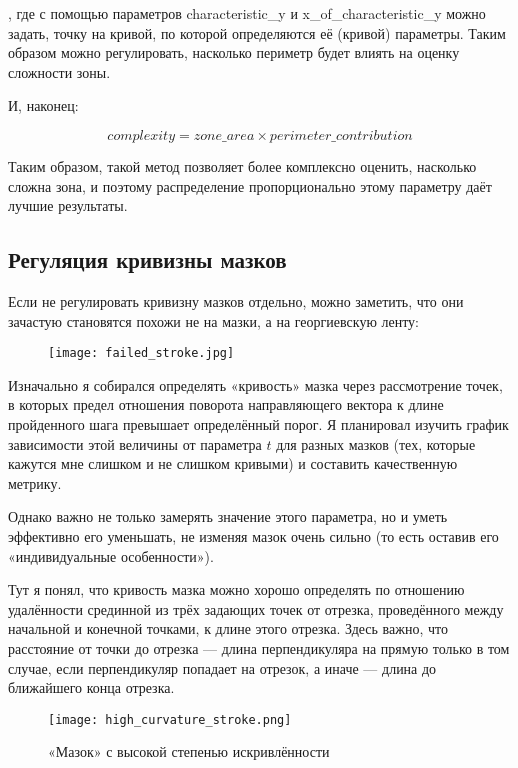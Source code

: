, где с помощью параметров characteristic\_y и x\_of\_characteristic\_y можно задать, точку на кривой,
по которой определяются её (кривой) параметры.
Таким образом можно регулировать, насколько периметр будет влиять на оценку сложности зоны.

И, наконец:

\begin{equation}
    complexity = zone\_area \times perimeter\_contribution
\end{equation}

Таким образом, такой метод позволяет более комплексно оценить, насколько сложна зона, и поэтому распределение пропорционально этому параметру даёт лучшие результаты.


\subsection{Регуляция кривизны мазков}\label{subsec:curvature-regulation}

Если не регулировать кривизну мазков отдельно, можно заметить,
что они зачастую становятся похожи не на мазки, а на георгиевскую ленту:

\begin{figure}[h!]
    \centering
    \texttt{[image: failed\_stroke.jpg]}
    \label{fig:failed_stroke}
\end{figure}
\FloatBarrier

Изначально я собирался определять «кривость» мазка через рассмотрение точек,
в которых предел отношения поворота направляющего вектора к длине пройденного шага превышает определённый порог.
Я планировал изучить график зависимости этой величины от параметра $t$ для разных мазков
(тех, которые кажутся мне слишком и не слишком кривыми) и составить качественную метрику.

Однако важно не только замерять значение этого параметра, но и уметь эффективно его уменьшать,
не изменяя мазок очень сильно (то есть оставив его «индивидуальные особенности»).

Тут я понял, что кривость мазка можно хорошо определять по отношению удалённости срединной из трёх задающих точек от отрезка,
проведённого между начальной и конечной точками, к длине этого отрезка.
Здесь важно, что расстояние от точки до отрезка — длина перпендикуляра на прямую только в том случае,
если перпендикуляр попадает на отрезок, а иначе — длина до ближайшего конца отрезка.

\begin{figure}[h!]
    \centering
    \texttt{[image: high\_curvature\_stroke.png]}
    \caption{«Мазок» с высокой степенью искривлённости}
    \label{fig:high_curvature_stroke}
\end{figure}
\FloatBarrier

